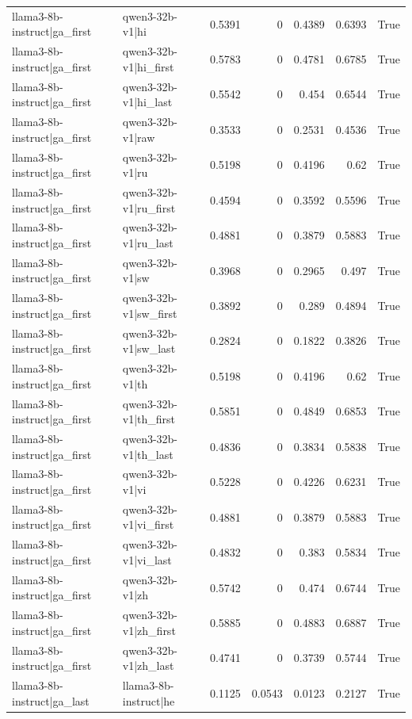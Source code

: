 \begin{table}
\begin{tabular}{l l r r r r l}
llama3-8b-instruct|ga_first & qwen3-32b-v1|hi & 0.5391 & 0 & 0.4389 & 0.6393 & True \\
llama3-8b-instruct|ga_first & qwen3-32b-v1|hi_first & 0.5783 & 0 & 0.4781 & 0.6785 & True \\
llama3-8b-instruct|ga_first & qwen3-32b-v1|hi_last & 0.5542 & 0 & 0.454 & 0.6544 & True \\
llama3-8b-instruct|ga_first & qwen3-32b-v1|raw & 0.3533 & 0 & 0.2531 & 0.4536 & True \\
llama3-8b-instruct|ga_first & qwen3-32b-v1|ru & 0.5198 & 0 & 0.4196 & 0.62 & True \\
llama3-8b-instruct|ga_first & qwen3-32b-v1|ru_first & 0.4594 & 0 & 0.3592 & 0.5596 & True \\
llama3-8b-instruct|ga_first & qwen3-32b-v1|ru_last & 0.4881 & 0 & 0.3879 & 0.5883 & True \\
llama3-8b-instruct|ga_first & qwen3-32b-v1|sw & 0.3968 & 0 & 0.2965 & 0.497 & True \\
llama3-8b-instruct|ga_first & qwen3-32b-v1|sw_first & 0.3892 & 0 & 0.289 & 0.4894 & True \\
llama3-8b-instruct|ga_first & qwen3-32b-v1|sw_last & 0.2824 & 0 & 0.1822 & 0.3826 & True \\
llama3-8b-instruct|ga_first & qwen3-32b-v1|th & 0.5198 & 0 & 0.4196 & 0.62 & True \\
llama3-8b-instruct|ga_first & qwen3-32b-v1|th_first & 0.5851 & 0 & 0.4849 & 0.6853 & True \\
llama3-8b-instruct|ga_first & qwen3-32b-v1|th_last & 0.4836 & 0 & 0.3834 & 0.5838 & True \\
llama3-8b-instruct|ga_first & qwen3-32b-v1|vi & 0.5228 & 0 & 0.4226 & 0.6231 & True \\
llama3-8b-instruct|ga_first & qwen3-32b-v1|vi_first & 0.4881 & 0 & 0.3879 & 0.5883 & True \\
llama3-8b-instruct|ga_first & qwen3-32b-v1|vi_last & 0.4832 & 0 & 0.383 & 0.5834 & True \\
llama3-8b-instruct|ga_first & qwen3-32b-v1|zh & 0.5742 & 0 & 0.474 & 0.6744 & True \\
llama3-8b-instruct|ga_first & qwen3-32b-v1|zh_first & 0.5885 & 0 & 0.4883 & 0.6887 & True \\
llama3-8b-instruct|ga_first & qwen3-32b-v1|zh_last & 0.4741 & 0 & 0.3739 & 0.5744 & True \\
llama3-8b-instruct|ga_last & llama3-8b-instruct|he & 0.1125 & 0.0543 & 0.0123 & 0.2127 & True \\

\end{tabular}
\end{table}
